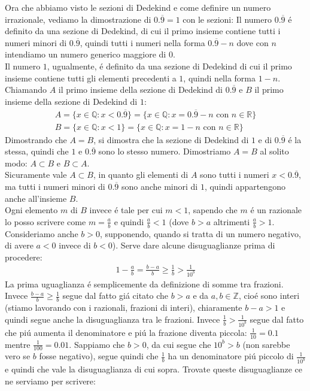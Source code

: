 \documentclass[twoside]{article} %
\begin{document}
	Ora che abbiamo visto le sezioni di Dedekind e come definire un numero irrazionale, vediamo la dimostrazione di $0.\overline{9}=1$ con le sezioni:
	Il numero $0.\overline{9}$ \'e definito da una sezione di Dedekind, di cui il primo  insieme contiene tutti i numeri minori di $0.\overline{9}$, quindi tutti i numeri nella forma $0.\overline{9}-n$ dove con $n$ intendiamo un numero generico maggiore di $0$.\\
	Il numero $1$, ugualmente, \'e definito da una sezione di Dedekind di cui il primo insieme contiene tutti gli elementi precedenti a $1$, quindi nella forma $1-n$.
	\newpage
	\noindent Chiamando $A$ il primo insieme della sezione di Dedekind di $0.\overline{9}$ e $B$ il primo insieme della sezione di Dedekind di $1$:
	\begin{gather*}
		A=\{x\in \mathbb{Q}:x<0.\overline{9}\}=\{x\in \mathbb{Q}:x=0.\overline{9}-n \text{ con }n\in \mathbb{R}\}\\
		B=\{x\in \mathbb{Q}:x<1\}=\{x\in \mathbb{Q}:x=1-n \text{ con }n\in \mathbb{R}\}
	\end{gather*} 
	Dimostrando che $A=B$, si dimostra che la sezione di Dedekind di $1$ e di $0.\overline{9}$ \'e la stessa, quindi che $1$ e $0.\overline{9}$ sono lo stesso numero. Dimostriamo $A=B$ al solito modo: $A\subset B$ e $B\subset A$.\\
	Sicuramente vale $A\subset B$, in quanto gli elementi di $A$ sono tutti i numeri $x<0.\overline{9}$, ma tutti i numeri minori di $0.\overline{9}$ sono anche minori di $1$, quindi appartengono anche all'insieme $B$.\\
	Ogni elemento $m$ di $B$ invece \'e tale per cui $m<1$, sapendo che $m$ \'e un razionale lo posso scrivere come $m=\frac{a}{b}$ e quindi $\frac{a}{b}<1$ (dove $b>a$ altrimenti $\frac{a}{b}>1$. Consideriamo anche $b>0$, supponendo, quando si tratta di un numero negativo, di avere $a<0$ invece di $b<0$). Serve dare alcune disuguaglianze prima di procedere:
	\begin{gather*}
		1-\frac{a}{b}=\frac{b-a}{b}\geq \frac{1}{b}>\frac{1}{10^b}
	\end{gather*}
	La prima uguaglianza \'e semplicemente da definizione di somme tra frazioni. Invece $\frac{b-a}{b}\geq \frac{1}{b}$ segue dal fatto gi\'a citato che $b>a$ e da $a,b\in \mathbb{Z}$, cio\'e sono interi (stiamo lavorando con i razionali, frazioni di interi), chiaramente $b-a>1$ e quindi segue anche la disuguaglianza tra le frazioni. Invece  $\frac{1}{b}>\frac{1}{10^b}$ segue dal fatto che pi\'u aumenta il denominatore e pi\'u la frazione diventa piccola: $\frac{1}{10}=0.1$ mentre $\frac{1}{100}=0.01$. Sappiamo che $b>0$, da cui segue che $10^b>b$ (non sarebbe vero se $b$ fosse negativo), segue quindi che $\frac{1}{b}$ ha un denominatore pi\'u piccolo di $\frac{1}{10^b}$ e quindi che vale la disuguaglianza di cui sopra. Trovate queste disuguaglianze ce ne serviamo per scrivere:
\end{document}
